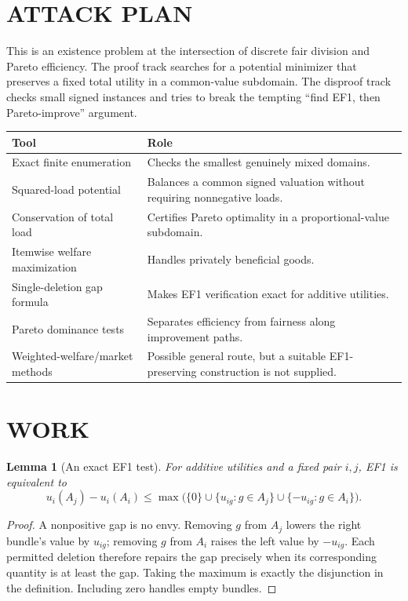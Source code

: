 \documentclass[11pt,a4paper]{article}
\newtheorem{lemma}[theorem]{Lemma}
\theoremstyle{remark}\newtheorem{remark}[theorem]{Remark}
\begin{document}
\section{ATTACK PLAN}
This is an existence problem at the intersection of discrete fair division and Pareto efficiency. The proof track searches for a potential minimizer that preserves a fixed total utility in a common-value subdomain. The disproof track checks small signed instances and tries to break the tempting ``find EF1, then Pareto-improve'' argument.

\begin{center}\begin{tabular}{p{.26\linewidth}p{.65\linewidth}}\toprule Tool&Role\\\midrule
Exact finite enumeration&Checks the smallest genuinely mixed domains.\\
Squared-load potential&Balances a common signed valuation without requiring nonnegative loads.\\
Conservation of total load&Certifies Pareto optimality in a proportional-value subdomain.\\
Itemwise welfare maximization&Handles privately beneficial goods.\\
Single-deletion gap formula&Makes EF1 verification exact for additive utilities.\\
Pareto dominance tests&Separates efficiency from fairness along improvement paths.\\
Weighted-welfare/market methods&Possible general route, but a suitable EF1-preserving construction is not supplied.\\\bottomrule\end{tabular}\end{center}

\section{WORK}
\begin{lemma}[An exact EF1 test]\label{lem:ef1test}
For additive utilities and a fixed pair $i,j$, EF1 is equivalent to
\[
u_i(A_j)-u_i(A_i)\le
\max\bigl(\{0\}\cup\{u_{ig}:g\in A_j\}\cup\{-u_{ig}:g\in A_i\}\bigr).
\]
\end{lemma}
\begin{proof}
A nonpositive gap is no envy. Removing $g$ from $A_j$ lowers the right bundle's value by $u_{ig}$; removing $g$ from $A_i$ raises the left value by $-u_{ig}$. Each permitted deletion therefore repairs the gap precisely when its corresponding quantity is at least the gap. Taking the maximum is exactly the disjunction in the definition. Including zero handles empty bundles.
\end{proof}
\end{document}
